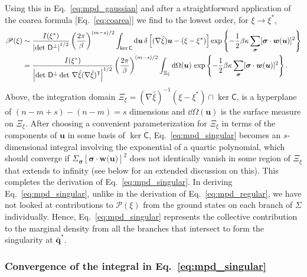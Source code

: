 %
Using this in Eq.~\eqref{eq:mpd_gaussian} and after a straightforward application of the coarea formula [Eq.~\eqref{eq:coarea}] we find to the lowest order, for $\xi \to \xi^{*}$,
%
\begin{equation}
  \begin{aligned}
    \mathscr{P}(\xi) &\sim \frac{I(\xi^{*})}{\left|\det\, \mathsf{D}^\perp\right|^{1/2}} \left(\frac{2\pi}{\beta}\right)^{(m-s)/2} \int_{\ker\mathsf{C}} \mathrm{d}\bm{u}\, \delta\left[(\nabla\hat{\xi})\bm{u} - (\xi - \xi^{*})\right] \exp\left\{-\frac{1}{2}\beta\kappa\sum_{\bm{\sigma}}[\bm{\sigma}\cdot \bm{w}(\bm{u})]^2\right\}\\
                                 &= \frac{I({\xi}^{*})}{\left|\det\, \mathsf{D}^\perp \det\, \nabla\hat{\xi}(\nabla\hat{\xi})^\mathsf{T}\right|^{1/2}}  \left(\frac{2\pi}{\beta}\right)^{(m-s)/2} \int_{\Xi_{\xi}} \mathrm{d}\Omega(\bm{u})\, \exp\left\{-\frac{1}{2}\beta\kappa\sum_{\bm{\sigma}}[\bm{\sigma}\cdot\bm{w}(\bm{u})]^2\right\}.
  \end{aligned}
  \label{eq:mpd_singular}
\end{equation}
%
Above, the integration domain $\Xi_{\xi} = (\nabla\hat{\xi})^{-1}(\xi - \xi^{*}) \cap \ker\mathsf{C}$, is a hyperplane of $(n - m + s) - (n - m) = s$ dimensions and $\dd\Omega(\bm{u})$ is the surface measure on $\Xi_{\xi}$.
After choosing a convenient parameterization for $\Xi_{\xi}$ in terms of the components of $\bm{u}$ in some basis of $\ker\mathsf{C}$, Eq.~\eqref{eq:mpd_singular} becomes an $s$-dimensional integral involving the exponential of a quartic polynomial, which should converge if $\Sigma_{\bm{\sigma}} [\bm{\sigma}\cdot\bm{w}(\bm{u)}]^2$ does not identically vanish in some region of $\Xi_{\xi}$ that extends to infinity (see below for an extended discussion on this).
This completes the derivation of Eq.~\eqref{eq:mpd_singular}.
In deriving Eq.~\eqref{eq:mpd_singular}, unlike in the derivation of Eq.~\eqref{eq:mpd_regular}, we have not looked at contributions to $\mathscr{P}(\xi)$ from the ground states on each branch of $\Sigma$ individually.
Hence, Eq.~\eqref{eq:mpd_singular} represents the collective contribution to the marginal density from all the branches that intersect to form the singularity at $\bar{\bm{q}}^{*}$.

\subsubsection*{Convergence of the integral in \texorpdfstring{Eq.~\eqref{eq:mpd_singular}}{Eq. (5)}}
\label{sec:convergence}

